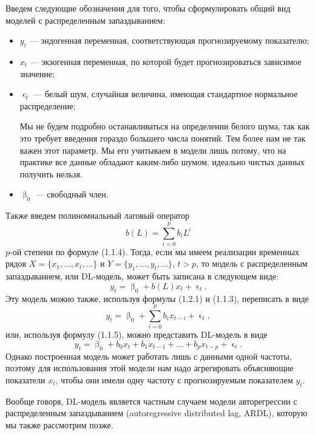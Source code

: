 \documentclass[a4paper, 12pt]{extarticle}
\numberwithin{equation}{subsection}
\renewcommand{\beta}{\upbeta}
\renewcommand{\epsilon}{\upvarepsilon}
\begin{document}
	Введем следующие обозначения для того, чтобы сформулировать общий вид моделей с распределенным запаздыванием:
	\begin{itemize}
		\item $y_t$ --- эндогенная переменная, соответствующая прогнозируемому показателю;
		\item $x_t$ --- экзогенная переменная, по которой будет прогнозироваться зависимое значение;
		\item $\epsilon_t$ --- белый шум, случайная величина, имеющая стандартное нормальное распределение;
		
		Мы не будем подробно останавливаться на определении белого шума, так как это требует введения гораздо большего числа понятий. Тем более нам не так важен этот параметр. Мы его учитываем в модели лишь потому, что на практике все данные обладают каким-либо шумом, идеально чистых данных получить нельзя.
		\item $\beta_0$ --- свободный член.
	\end{itemize}
	Также введем полиномиальный лаговый оператор
	\begin{equation}
		b(L) = \sum_{i=0}^{p} b_i L^i
	\end{equation} $p$-ой степени по формуле (1.1.4).
	Тогда, если мы имеем реализации временных рядов $X = \{x_1,\ldots, x_t,\ldots\}$ и $Y = \{y_1, \ldots, y_t, \ldots\}$, $t > p$, то модель с распределенным запаздыванием, или DL-модель, может быть записана в следующем виде:
	\begin{equation}
		y_t = \beta_0 + b(L)x_t + \epsilon_t.
	\end{equation}
	Эту модель можно также, используя формулы (1.2.1) и (1.1.3), переписать в виде
	\begin{equation}
		y_t = \beta_0 + \sum_{i=0}^{p} b_i x_{t-i} + \epsilon_t,
	\end{equation}
	или, используя формулу (1.1.5), можно представить DL-модель в виде
	\begin{equation}
		y_t = \beta_0 + b_0 x_t + b_1 x_{t-1} + \ldots + b_p x_{t-p} + \epsilon_t.
	\end{equation}
	Однако построенная модель может работать лишь с данными одной частоты, поэтому для использования этой модели нам надо агрегировать объясняющие показатели $x_t$, чтобы они имели одну частоту с прогнозируемым показателем $y_t$. 
	
	Вообще говоря, DL-модель является частным случаем модели авторегрессии с распределенным запаздыванием (autoregressive distributed lag, ARDL), которую мы также рассмотрим позже.
	
\end{document}
